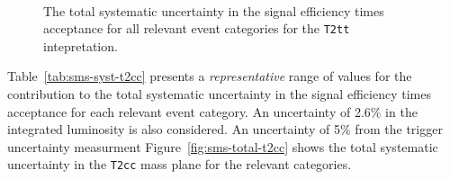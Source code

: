 \begin{figure}[h!]
  \begin{center}
    \\       
    \caption{\label{fig:sms-total-t2tt}The total systematic
      uncertainty in the signal efficiency times acceptance for all
      relevant event categories for the \texttt{T2tt} intepretation.}
  \end{center}
\end{figure}

Table~\ref{tab:sms-syst-t2cc} presents a {\it representative} range of
values for the contribution to the total systematic uncertainty in the
signal efficiency times acceptance for each relevant event
category. An uncertainty of 2.6\% in the integrated luminosity is also
considered. An uncertainty of 5\% from the trigger uncertainty measurment
Figure~\ref{fig:sms-total-t2cc} shows the total systematic uncertainty 
in the \verb!T2cc! mass plane for the relevant categories.

